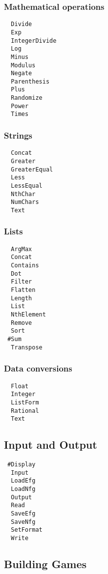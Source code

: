 \subsubsection{Mathematical operations}

\begin{verbatim}
  Divide 
  Exp 
  IntegerDivide 
  Log 
  Minus 
  Modulus 
  Negate 
  Parenthesis 
  Plus 
  Randomize 
  Power 
  Times 
\end{verbatim}

\subsubsection{Strings}

\begin{verbatim}
  Concat
  Greater
  GreaterEqual
  Less
  LessEqual
  NthChar 
  NumChars 
  Text
\end{verbatim}

\subsubsection{Lists}

\begin{verbatim}
  ArgMax 
  Concat 
  Contains 
  Dot 
  Filter 
  Flatten 
  Length 
  List 
  NthElement 
  Remove 
  Sort 
 #Sum 
  Transpose 
\end{verbatim}

\subsubsection{Data conversions}

\begin{verbatim}
  Float 
  Integer 
  ListForm 
  Rational 
  Text 
\end{verbatim}

\subsection{Input and Output}

\begin{verbatim}
 #Display 
  Input 
  LoadEfg 
  LoadNfg 
  Output 
  Read 
  SaveEfg 
  SaveNfg 
  SetFormat 
  Write   
\end{verbatim}

\subsection{Building Games}

